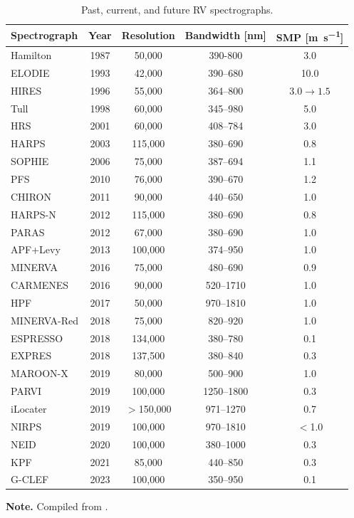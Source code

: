 \begin{table}
    \centering
    \small
\begin{threeparttable}
    \caption[History of radial-velocity spectrographs]{Past, current, and future RV spectrographs.}
    \begin{tabular}{lcccc}
        \hline
        \hline
        Spectrograph & Year & Resolution & Bandwidth [\si{\nano\meter}] & SMP [\si{\meter\per\second}] \\
        \hline
        Hamilton & 1987 & 50,000 & 390-800 & 3.0 \\
        ELODIE & 1993 & 42,000 & 390--680 & 10.0 \\
        HIRES & 1996 & 55,000 & 364--800 & $3.0\rightarrow1.5$ \\
        Tull & 1998 & 60,000 & 345--980 & 5.0 \\
        HRS & 2001 & 60,000 & 408--784 & 3.0 \\
        \hline
        HARPS & 2003 & 115,000 & 380--690 & 0.8 \\
        SOPHIE & 2006 & 75,000 & 387--694 & 1.1 \\
        PFS & 2010 & 76,000 & 390--670 & 1.2 \\
        CHIRON & 2011 & 90,000 & 440--650 & 1.0 \\
        HARPS-N & 2012 & 115,000 & 380--690 & 0.8 \\
        PARAS & 2012 & 67,000 & 380--690 & 1.0 \\
        APF+Levy & 2013 & 100,000 & 374--950 & 1.0 \\
        \hline
        MINERVA & 2016 & 75,000 & 480--690 & 0.9 \\
        CARMENES & 2016 & 90,000 & 520--1710 & 1.0 \\
        HPF & 2017 & 50,000 & 970--1810 & 1.0 \\
        MINERVA-Red & 2018 & 75,000 & 820--920 & 1.0 \\
        ESPRESSO & 2018 & 134,000 & 380--780 & 0.1 \\
        EXPRES & 2018 & 137,500 & 380--840 & 0.3 \\
        MAROON-X & 2019 & 80,000 & 500--900 & 1.0 \\
        PARVI & 2019 & 100,000 & 1250--1800 & 0.3 \\
        iLocater & 2019 & $>$150,000 & 971--1270 & 0.7 \\
        NIRPS & 2019 & 100,000 & 970--1810 & $<$1.0 \\
        NEID & 2020 & 100,000 & 380--1000 & 0.3 \\
        KPF & 2021 & 85,000 & 440--850 & 0.3 \\
        G-CLEF & 2023 & 100,000 & 350--950 & 0.1 \\
        \hline
    \end{tabular}
	\begin{tablenotes}
	\item \textbf{Note.} Compiled from \citet{fischer_state_2016, wright_third_2017}.
	\end{tablenotes}
\end{threeparttable}
\label{tab:spectrographs}
\end{table}

